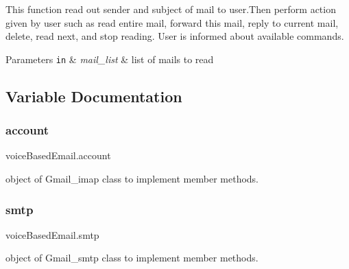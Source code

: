 This function read out sender and subject of mail to user.\+Then perform action given by user such as read entire mail, forward this mail, reply to current mail, delete, read next, and stop reading. User is informed about available commands.


\begin{DoxyParams}[1]{Parameters}
\mbox{\tt in}  & {\em mail\+\_\+list} & list of mails to read \\
\hline
\end{DoxyParams}


\subsection{Variable Documentation}
\mbox{\label{namespacevoiceBasedEmail_a027c09bdec7448ff2e44fe874dbde271}} 
\subsubsection{\texorpdfstring{account}{account}}
{\footnotesize\ttfamily voice\+Based\+Email.\+account}



object of Gmail\+\_\+imap class to implement member methods. 

\mbox{\label{namespacevoiceBasedEmail_ab69ec372b938baefc499493e55bb19ad}} 
\subsubsection{\texorpdfstring{smtp}{smtp}}
{\footnotesize\ttfamily voice\+Based\+Email.\+smtp}



object of Gmail\+\_\+smtp class to implement member methods. 

